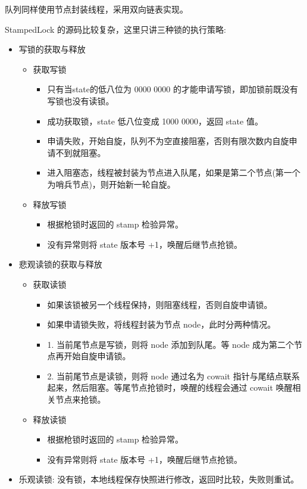 队列同样使用节点封装线程，采用双向链表实现。

StampedLock 的源码比较复杂，这里只讲三种锁的执行策略:
\begin{itemize}
    \item 写锁的获取与释放
    \begin{itemize}
        \item 获取写锁
        \begin{itemize}
            \item 只有当state的低八位为 0000 0000 的才能申请写锁，即加锁前既没有写锁也没有读锁。
            \item 成功获取锁，state 低八位变成 1000 0000，返回 state 值。
            \item 申请失败，开始自旋，队列不为空直接阻塞，否则有限次数内自旋申请不到就阻塞。
            \item 进入阻塞态，线程被封装为节点进入队尾，如果是第二个节点(第一个为哨兵节点)，则开始新一轮自旋。
        \end{itemize}
        \item 释放写锁
        \begin{itemize}
            \item 根据枪锁时返回的 stamp 检验异常。
            \item 没有异常则将 state 版本号 +1，唤醒后继节点抢锁。
        \end{itemize}
    \end{itemize}
    \item 悲观读锁的获取与释放
    \begin{itemize}
        \item 获取读锁
        \begin{itemize}
            \item 如果该锁被另一个线程保持，则阻塞线程，否则自旋申请锁。
            \item 如果申请锁失败，将线程封装为节点 node，此时分两种情况。
            \item 1. 当前尾节点是写锁，则将 node 添加到队尾。等 node 成为第二个节点再开始自旋申请锁。
            \item 2. 当前尾节点是读锁，则将 node 通过名为 cowait 指针与尾结点联系起来，然后阻塞。等尾节点抢锁时，唤醒的线程会通过 cowait 唤醒相关节点来抢锁。
        \end{itemize}
        \item 释放读锁
        \begin{itemize}
            \item 根据枪锁时返回的 stamp 检验异常。
            \item 没有异常则将 state 版本号 +1，唤醒后继节点抢锁。
        \end{itemize}
    \end{itemize}
    \item 乐观读锁: 没有锁，本地线程保存快照进行修改，返回时比较，失败则重试。
\end{itemize}

